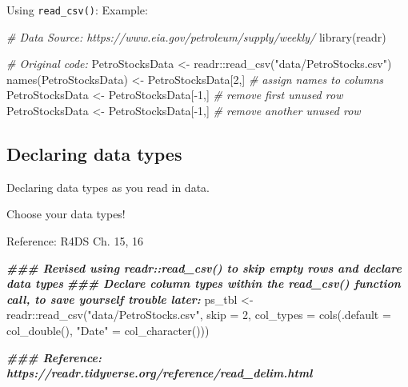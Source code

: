 \documentclass[
]{book}
\newenvironment{Shaded}{\begin{snugshade}}{\end{snugshade}}
\newcommand{\AttributeTok}[1]{\textcolor[rgb]{0.77,0.63,0.00}{#1}}
\newcommand{\CommentTok}[1]{\textcolor[rgb]{0.56,0.35,0.01}{\textit{#1}}}
\newcommand{\DecValTok}[1]{\textcolor[rgb]{0.00,0.00,0.81}{#1}}
\newcommand{\DocumentationTok}[1]{\textcolor[rgb]{0.56,0.35,0.01}{\textbf{\textit{#1}}}}
\newcommand{\FunctionTok}[1]{\textcolor[rgb]{0.00,0.00,0.00}{#1}}
\newcommand{\NormalTok}[1]{#1}
\newcommand{\OtherTok}[1]{\textcolor[rgb]{0.56,0.35,0.01}{#1}}
\newcommand{\SpecialCharTok}[1]{\textcolor[rgb]{0.00,0.00,0.00}{#1}}
\newcommand{\StringTok}[1]{\textcolor[rgb]{0.31,0.60,0.02}{#1}}
\begin{document}
Using \texttt{read\_csv()}: Example:

\begin{Shaded}
\begin{Highlighting}[]
\CommentTok{\# Data Source: https://www.eia.gov/petroleum/supply/weekly/}
\FunctionTok{library}\NormalTok{(readr)}

\CommentTok{\# Original code:}
\NormalTok{PetroStocksData }\OtherTok{\textless{}{-}}\NormalTok{ readr}\SpecialCharTok{::}\FunctionTok{read\_csv}\NormalTok{(}\StringTok{"data/PetroStocks.csv"}\NormalTok{)}
\FunctionTok{names}\NormalTok{(PetroStocksData) }\OtherTok{\textless{}{-}}\NormalTok{ PetroStocksData[}\DecValTok{2}\NormalTok{,] }\CommentTok{\# assign names to columns}
\NormalTok{PetroStocksData }\OtherTok{\textless{}{-}}\NormalTok{ PetroStocksData[}\SpecialCharTok{{-}}\DecValTok{1}\NormalTok{,]       }\CommentTok{\# remove first unused row}
\NormalTok{PetroStocksData }\OtherTok{\textless{}{-}}\NormalTok{ PetroStocksData[}\SpecialCharTok{{-}}\DecValTok{1}\NormalTok{,]       }\CommentTok{\# remove another unused row}
\end{Highlighting}
\end{Shaded}

\hypertarget{declaring-data-types}{%
\subsection{Declaring data types}\label{declaring-data-types}}

Declaring data types as you read in data.

Choose your data types!

Reference: R4DS Ch. 15, 16

\begin{Shaded}
\begin{Highlighting}[]
\DocumentationTok{\#\#\# Revised using readr::read\_csv() to skip empty rows and declare data types}
\DocumentationTok{\#\#\# Declare column types within the read\_csv() function call, to save yourself trouble later:}
\NormalTok{ps\_tbl }\OtherTok{\textless{}{-}}\NormalTok{ readr}\SpecialCharTok{::}\FunctionTok{read\_csv}\NormalTok{(}\StringTok{"data/PetroStocks.csv"}\NormalTok{, }\AttributeTok{skip =} \DecValTok{2}\NormalTok{, }\AttributeTok{col\_types =} \FunctionTok{cols}\NormalTok{(}\AttributeTok{.default =} \FunctionTok{col\_double}\NormalTok{(),}
                                                                       \StringTok{"Date"}   \OtherTok{=} \FunctionTok{col\_character}\NormalTok{())) }

\DocumentationTok{\#\#\# Reference: https://readr.tidyverse.org/reference/read\_delim.html}
\end{Highlighting}
\end{Shaded}
\end{document}
